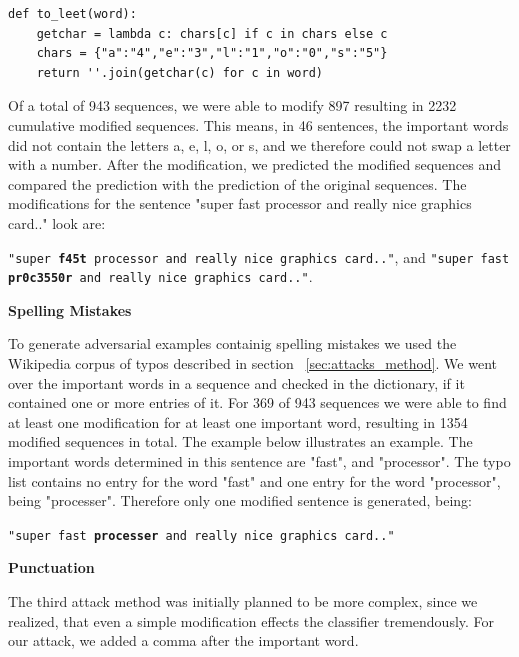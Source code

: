 \begin{lstlisting}
def to_leet(word):
    getchar = lambda c: chars[c] if c in chars else c
    chars = {"a":"4","e":"3","l":"1","o":"0","s":"5"}
    return ''.join(getchar(c) for c in word)
\end{lstlisting}
Of a total of 943 sequences, we were able to modify 897 resulting in 2232 cumulative modified sequences. This means, in 46 sentences, the important words did not contain the letters a, e, l, o, or s, and we therefore could not swap a letter with a number.
After the modification, we predicted the modified sequences and compared the prediction with the prediction of the original sequences. 
The modifications for the sentence "super fast processor and really nice graphics card.." look are:

\texttt{"super \textbf{f45t} processor and really nice graphics card.."}, and
\texttt{"super fast \textbf{pr0c3550r} and really nice graphics card.."}.


\textbf{Spelling Mistakes}

To generate adversarial examples containig spelling mistakes we used the Wikipedia corpus of typos described in section ~\ref{sec:attacks_method}. We went over the important words in a sequence and checked in the dictionary, if it contained one or more entries of it. For 369 of 943 sequences we were able to find at least one modification for at least one important word, resulting in 1354  modified sequences in total.
The example below illustrates an example. The important words determined in this sentence are "fast", and "processor". The typo list contains no entry for the word "fast" and one entry for the word "processor", being "processer". Therefore only one modified sentence is generated, being:

\texttt{"super fast \textbf{processer} and really nice graphics card.."}

\textbf{Punctuation}

The third attack method was initially planned to be more complex, since we realized, that even a simple modification effects the classifier tremendously. For our attack, we added a comma after the important word. 

